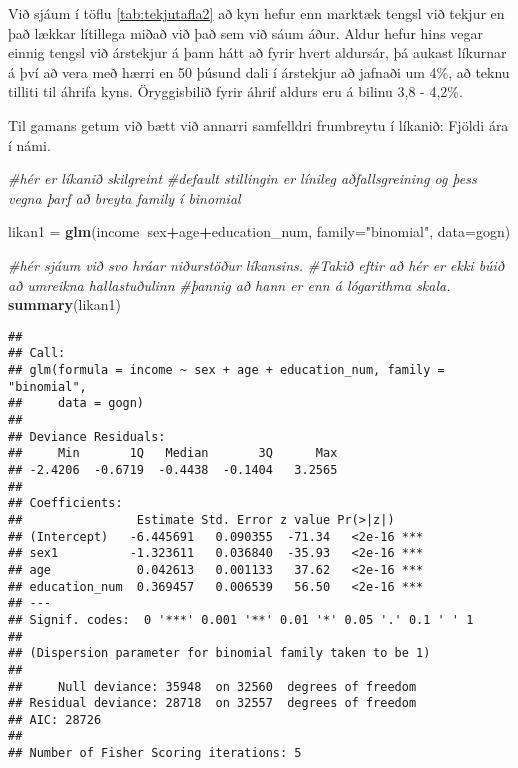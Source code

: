 \documentclass[]{book}
\newenvironment{Shaded}{\begin{snugshade}}{\end{snugshade}}
\newcommand{\CommentTok}[1]{\textcolor[rgb]{0.56,0.35,0.01}{\textit{#1}}}
\newcommand{\DataTypeTok}[1]{\textcolor[rgb]{0.13,0.29,0.53}{#1}}
\newcommand{\KeywordTok}[1]{\textcolor[rgb]{0.13,0.29,0.53}{\textbf{#1}}}
\newcommand{\NormalTok}[1]{#1}
\newcommand{\OperatorTok}[1]{\textcolor[rgb]{0.81,0.36,0.00}{\textbf{#1}}}
\newcommand{\StringTok}[1]{\textcolor[rgb]{0.31,0.60,0.02}{#1}}
\begin{document}
Við sjáum í töflu \ref{tab:tekjutafla2} að kyn hefur enn marktæk tengsl við tekjur en það lækkar lítillega miðað við það sem við sáum áður. Aldur hefur hins vegar einnig tengsl við árstekjur á þann hátt að fyrir hvert aldursár, þá aukast líkurnar á því að vera með hærri en 50 þúsund dali í árstekjur að jafnaði um 4\%, að teknu tilliti til áhrifa kyns. Öryggisbilið fyrir áhrif aldurs eru á bilinu 3,8 - 4,2\%.

Til gamans getum við bætt við annarri samfelldri frumbreytu í líkanið: Fjöldi ára í námi.

\begin{Shaded}
\begin{Highlighting}[]
\CommentTok{#hér er líkanið skilgreint}
\CommentTok{#default stillingin er línileg aðfallsgreining og þess vegna þarf að breyta family í binomial}

\NormalTok{likan1 =}\StringTok{ }\KeywordTok{glm}\NormalTok{(income}\OperatorTok{~}\NormalTok{sex}\OperatorTok{+}\NormalTok{age}\OperatorTok{+}\NormalTok{education_num, }\DataTypeTok{family=}\StringTok{"binomial"}\NormalTok{, }\DataTypeTok{data=}\NormalTok{gogn)}

\CommentTok{#hér sjáum við svo hráar niðurstöður líkansins. }
\CommentTok{#Takið eftir að hér er ekki búið að umreikna hallastuðulinn }
\CommentTok{#þannig að hann er enn á lógarithma skala.}
\KeywordTok{summary}\NormalTok{(likan1)}
\end{Highlighting}
\end{Shaded}

\begin{verbatim}
## 
## Call:
## glm(formula = income ~ sex + age + education_num, family = "binomial", 
##     data = gogn)
## 
## Deviance Residuals: 
##     Min       1Q   Median       3Q      Max  
## -2.4206  -0.6719  -0.4438  -0.1404   3.2565  
## 
## Coefficients:
##                Estimate Std. Error z value Pr(>|z|)    
## (Intercept)   -6.445691   0.090355  -71.34   <2e-16 ***
## sex1          -1.323611   0.036840  -35.93   <2e-16 ***
## age            0.042613   0.001133   37.62   <2e-16 ***
## education_num  0.369457   0.006539   56.50   <2e-16 ***
## ---
## Signif. codes:  0 '***' 0.001 '**' 0.01 '*' 0.05 '.' 0.1 ' ' 1
## 
## (Dispersion parameter for binomial family taken to be 1)
## 
##     Null deviance: 35948  on 32560  degrees of freedom
## Residual deviance: 28718  on 32557  degrees of freedom
## AIC: 28726
## 
## Number of Fisher Scoring iterations: 5
\end{verbatim}
\end{document}
